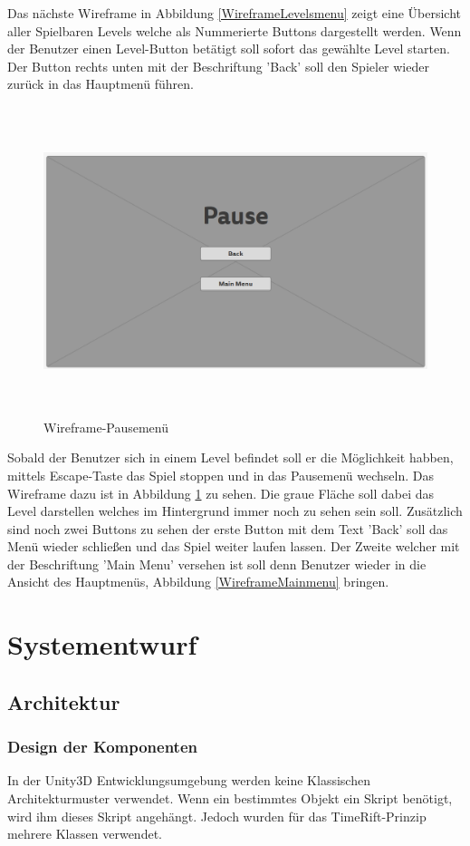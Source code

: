 Das nächste Wireframe in Abbildung \ref{WireframeLevelsmenu} zeigt eine Übersicht aller Spielbaren Levels welche als Nummerierte Buttons dargestellt werden. Wenn der Benutzer einen Level-Button betätigt soll  sofort das gewählte Level starten. Der Button rechts unten mit der Beschriftung 'Back' soll den Spieler wieder zurück in das Hauptmenü führen. 
\begin{figure}[H]
	\centering
	\includegraphics[width=16cm, height=9cm]{images/WireframePausemenu.png}
	\caption{Wireframe-Pausemenü}
	\label{WireframePausemenu}
\end{figure}
Sobald der Benutzer sich in einem Level befindet soll er die Möglichkeit habben, mittels Escape-Taste das Spiel stoppen und in das Pausemenü wechseln. Das Wireframe dazu ist in Abbildung \ref{WireframePausemenu} zu sehen. Die graue Fläche soll dabei das Level darstellen welches im Hintergrund immer noch zu sehen sein soll. Zusätzlich sind noch zwei Buttons zu sehen der erste Button mit dem Text 'Back' soll das Menü wieder schließen und das Spiel weiter laufen lassen. Der Zweite welcher mit der Beschriftung 'Main Menu' versehen ist soll denn Benutzer wieder in die Ansicht des Hauptmenüs, Abbildung \ref{WireframeMainmenu} bringen. 
\chapter{Systementwurf}

\section{Architektur}

\subsection{Design der Komponenten}
In der Unity3D Entwicklungsumgebung werden keine Klassischen Architekturmuster verwendet. Wenn ein bestimmtes Objekt ein Skript benötigt, wird ihm dieses Skript angehängt. Jedoch wurden für das TimeRift-Prinzip mehrere Klassen verwendet.


